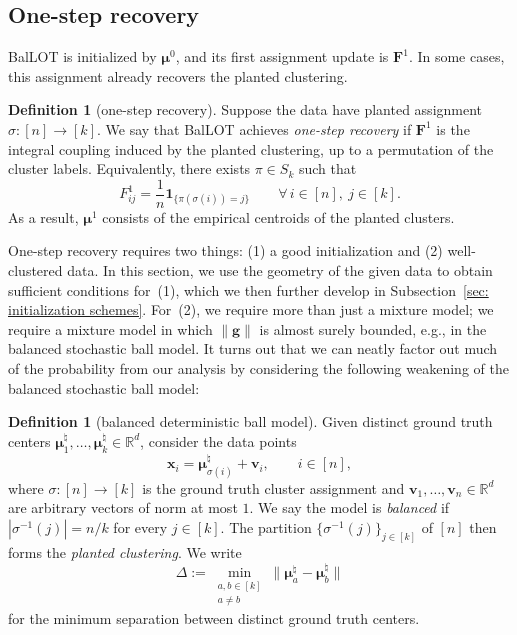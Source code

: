 \documentclass{article}
\theoremstyle{plain}
\theoremstyle{definition}
\newtheorem{definition}[theorem]{Definition}
\newcommand{\1}{\mathbf{1}}
\newcommand{\bmF}{\bm{F}}
\newcommand{\bmu}{\bm{\mu}}
\begin{document}
\subsection{One-step recovery}
\label{sec: one-step recovery under SBM}

BalLOT is initialized by $\bmu^0$, and its first assignment update is $\bmF^1$.
In some cases, this assignment already recovers the planted clustering.

\begin{definition}[one-step recovery]
\label{def: one-step recovery}
Suppose the data have planted assignment $\sigma\colon[n]\to[k]$.
We say that BalLOT achieves \textit{one-step recovery} if $\bmF^1$ is the integral coupling induced by the planted clustering, up to a permutation of the cluster labels.
Equivalently, there exists $\pi\in S_k$ such that
\[
F^1_{ij}=\frac{1}{n}\bm{1}_{\{\pi(\sigma(i))=j\}}
\qquad \forall\,i\in[n],\ j\in[k].
\]
As a result, $\bmu^1$ consists of the empirical centroids of the planted clusters.
\end{definition}

One-step recovery requires two things: (1) a good initialization and (2) well-clustered data.
In this section, we use the geometry of the given data to obtain sufficient conditions for~(1), which we then further develop in Subsection~\ref{sec: initialization schemes}.
For~(2), we require more than just a mixture model; we require a mixture model in which $\|\bm{g}\|$ is almost surely bounded, e.g., in the balanced stochastic ball model.
It turns out that we can neatly factor out much of the probability from our analysis by considering the following weakening of the balanced stochastic ball model:

\begin{definition}[balanced deterministic ball model]
\label{def.deterministic ball model}
Given distinct ground truth centers $\bmu^\natural_1,\ldots,\bmu^\natural_k\in\mathbb{R}^d$, consider the data points
\[
\bm{x}_i=\bmu^\natural_{\sigma(i)}+\bm{v}_i,
\qquad i\in[n],
\]
where $\sigma\colon[n]\to[k]$ is the ground truth cluster assignment and $\bm{v}_1,\ldots,\bm{v}_n\in \mathbb{R}^d$ are arbitrary vectors of norm at most $1$.
We say the model is \textit{balanced} if $|\sigma^{-1}(j)|=n/k$ for every $j\in[k]$.
The partition $\{ \sigma^{-1}(j)\}_{j\in[k]}$ of $[n]$ then forms the \textit{planted clustering}.
We write
\[
\Delta:=\min_{\substack{a,b\in[k]\\a\neq b}}\|\bmu^\natural_a-\bmu^\natural_b\|
\]
for the minimum separation between distinct ground truth centers.
\end{definition}
\end{document}
